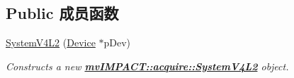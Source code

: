 \subsection*{Public 成员函数}
\begin{DoxyCompactItemize}
\item 
\hyperlink{classmv_i_m_p_a_c_t_1_1acquire_1_1_system_v4_l2_aea82e3241696f1ff8597fe83262acd6b}{System\+V4\+L2} (\hyperlink{classmv_i_m_p_a_c_t_1_1acquire_1_1_device}{Device} $\ast$p\+Dev)
\begin{DoxyCompactList}\small\item\em Constructs a new {\bfseries \hyperlink{classmv_i_m_p_a_c_t_1_1acquire_1_1_system_v4_l2}{mv\+I\+M\+P\+A\+C\+T\+::acquire\+::\+System\+V4\+L2}} object. \end{DoxyCompactList}\end{DoxyCompactItemize}
